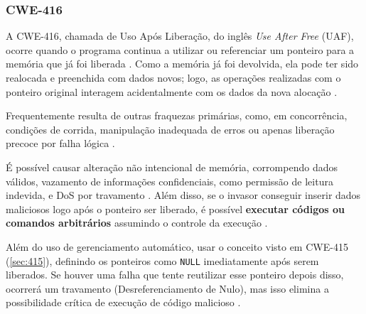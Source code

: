 \documentclass[
    12pt,                %
    openright,           %
    oneside,             %
    a4paper,             %
    english,             %
    brazil               %
]{abntex2}
\begin{document}
\begin{itemize}
\subsubsection{CWE-416}
\label{sec:416}
\par
A CWE-416, chamada de Uso Após Liberação, do inglês \textit{Use After Free} (UAF), ocorre quando o programa continua a utilizar ou referenciar um ponteiro para a memória que já foi liberada \cite{cwe416}.
Como a memória já foi devolvida, ela pode ter sido realocada e preenchida com dados novos; logo, as operações realizadas com o ponteiro original interagem acidentalmente com os dados da nova alocação \cite{cwe416}.
\par 
Frequentemente resulta de outras fraquezas primárias, como, em concorrência, condições de corrida, manipulação inadequada de erros ou apenas liberação precoce por falha lógica \cite{cwe416}.
\par 
É possível causar alteração não intencional de memória, corrompendo dados válidos, vazamento de informações confidenciais, como permissão de leitura indevida, e DoS por travamento \cite{cwe416}.
Além disso, se o invasor conseguir inserir dados maliciosos logo após o ponteiro ser liberado, é possível \textbf{executar códigos ou comandos arbitrários} assumindo o controle da execução \cite{cwe416}.
\par
Além do uso de gerenciamento automático, usar o conceito visto em CWE-415 (\ref{sec:415}), definindo os ponteiros como \texttt{NULL} imediatamente após serem liberados.
Se houver uma falha que tente reutilizar esse ponteiro depois disso, ocorrerá um travamento (Desreferenciamento de Nulo), mas isso elimina a possibilidade crítica de execução de código malicioso \cite{cwe415}.


\end{itemize}
\end{document}
